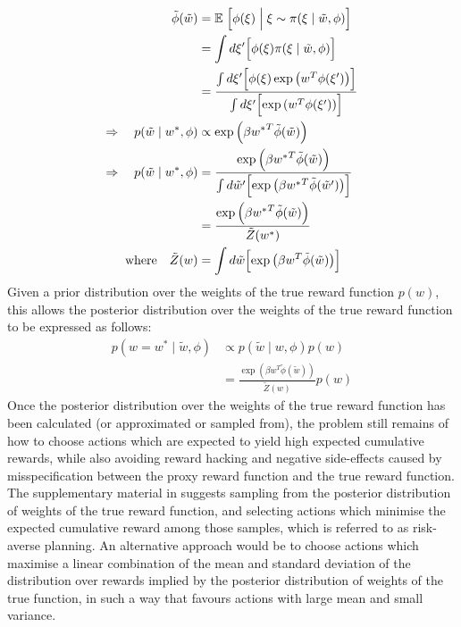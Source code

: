 \begin{align*}
    \tilde{\phi}(\tilde{w}) &= \mathbb{E}\left. \Bigl[ \phi(\xi) \;\middle\vert\; \xi \sim \pi(\xi\mid \tilde{w}, \phi) \Bigr] \right. \\
    &= \int{ d\xi'\Bigl[ \phi(\xi) \pi(\xi\mid \tilde{w}, \phi) \Bigr]} \\
    &= \frac{\int{ d\xi'\Bigl[ \phi(\xi) \exp\left( w^T \phi(\xi') \right) \Bigr]}}{\int{ d\xi'\Bigl[ \exp\left( w^T \phi(\xi') \right) \Bigr]}} \\
    \Rightarrow \quad p(\tilde{w} \mid w^*, \phi) &\propto \exp\left( \beta {w^*}^T \tilde{\phi}(\tilde{w}) \right) \\
    \Rightarrow \quad p(\tilde{w} \mid w^*, \phi) &= \frac{\exp\left( \beta {w^*}^T \tilde{\phi}(\tilde{w}) \right)}{\int{ d\tilde{w}' \Bigl[ \exp\left( \beta {w^*}^T \tilde{\phi}(\tilde{w}') \right) \Bigr]}} \\
    &= \frac{\exp\left( \beta {w^*}^T \tilde{\phi}(\tilde{w}) \right)}{\tilde{Z}(w^*)} \\
    \text{where} \quad \tilde{Z}(w) &= \int{ d\tilde{w} \Bigl[ \exp\left( \beta {w}^T \tilde{\phi}(\tilde{w}) \right) \Bigr]}
\end{align*}
Given a prior distribution over the weights of the true reward function $p(w)$, this allows the posterior distribution over the weights of the true reward function to be expressed as follows:
\begin{align*}
    p(w=w^*\mid \tilde{w}, \phi) &\propto p(\tilde{w} \mid w, \phi) p(w) \\
    &= \frac{\exp\left( \beta {w}^T \tilde{\phi}(\tilde{w}) \right)}{\tilde{Z}(w)} p(w) \label{eq:reward posterior}
\end{align*}
Once the posterior distribution over the weights of the true reward function has been calculated (or approximated or sampled from), the problem still remains of how to choose actions which are expected to yield high expected cumulative rewards, while also avoiding reward hacking and negative side-effects caused by misspecification between the proxy reward function and the true reward function. The supplementary material in \cite{hadfield2017inverse} suggests sampling from the posterior distribution of weights of the true reward function, and selecting actions which minimise the expected cumulative reward among those samples, which is referred to as risk-averse planning. An alternative approach would be to choose actions which maximise a linear combination of the mean and standard deviation of the distribution over rewards implied by the posterior distribution of weights of the true function, in such a way that favours actions with large mean and small variance.
